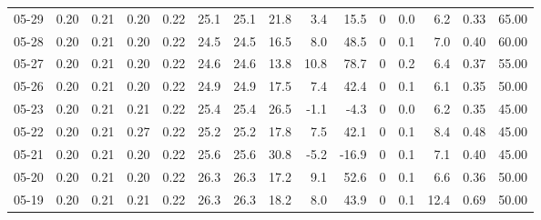 \begin{threeparttable}
{\begin{tabular}{lrrrrrrrrrrrrrr}
  05-29 &          0.20 &          0.21 &          0.20 &        0.22 &                25.1 &               25.1 &                21.8 &        3.4 &         15.5 &              0 &                 0.0 &              6.2 &            0.33 &                  65.00 \\
  05-28 &          0.20 &          0.21 &          0.20 &        0.22 &                24.5 &               24.5 &                16.5 &        8.0 &         48.5 &              0 &                 0.1 &              7.0 &            0.40 &                  60.00 \\
  05-27 &          0.20 &          0.21 &          0.20 &        0.22 &                24.6 &               24.6 &                13.8 &       10.8 &         78.7 &              0 &                 0.2 &              6.4 &            0.37 &                  55.00 \\
  05-26 &          0.20 &          0.21 &          0.20 &        0.22 &                24.9 &               24.9 &                17.5 &        7.4 &         42.4 &              0 &                 0.1 &              6.1 &            0.35 &                  50.00 \\
  05-23 &          0.20 &          0.21 &          0.21 &        0.22 &                25.4 &               25.4 &                26.5 &       -1.1 &         -4.3 &              0 &                 0.0 &              6.2 &            0.35 &                  45.00 \\
  05-22 &          0.20 &          0.21 &          0.27 &        0.22 &                25.2 &               25.2 &                17.8 &        7.5 &         42.1 &              0 &                 0.1 &              8.4 &            0.48 &                  45.00 \\
  05-21 &          0.20 &          0.21 &          0.20 &        0.22 &                25.6 &               25.6 &                30.8 &       -5.2 &        -16.9 &              0 &                 0.1 &              7.1 &            0.40 &                  45.00 \\
  05-20 &          0.20 &          0.21 &          0.20 &        0.22 &                26.3 &               26.3 &                17.2 &        9.1 &         52.6 &              0 &                 0.1 &              6.6 &            0.36 &                  50.00 \\
  05-19 &          0.20 &          0.21 &          0.21 &        0.22 &                26.3 &               26.3 &                18.2 &        8.0 &         43.9 &              0 &                 0.1 &             12.4 &            0.69 &                  50.00 \\

\end{tabular}}
\end{threeparttable}
